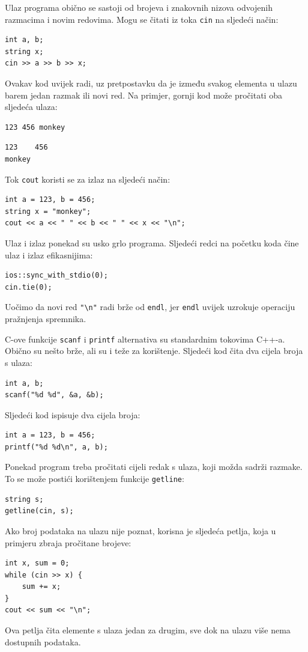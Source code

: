 Ulaz programa obično se sastoji od
brojeva i znakovnih nizova odvojenih
razmacima i novim redovima.
Mogu se čitati iz toka \texttt{cin}
na sljedeći način:

\begin{lstlisting}
int a, b;
string x;
cin >> a >> b >> x;
\end{lstlisting}

Ovakav kod uvijek radi,
uz pretpostavku da je između svakog elementa u ulazu
barem jedan razmak ili novi red.
Na primjer, gornji kod može pročitati
oba sljedeća ulaza:
\begin{lstlisting}
123 456 monkey
\end{lstlisting}
\begin{lstlisting}
123    456
monkey
\end{lstlisting}
Tok \texttt{cout} koristi se za izlaz
na sljedeći način:
\begin{lstlisting}
int a = 123, b = 456;
string x = "monkey";
cout << a << " " << b << " " << x << "\n";
\end{lstlisting}

Ulaz i izlaz ponekad su
usko grlo programa.
Sljedeći redci na početku koda
čine ulaz i izlaz efikasnijima:

\begin{lstlisting}
ios::sync_with_stdio(0);
cin.tie(0);
\end{lstlisting}

Uočimo da novi red \texttt{"\textbackslash n"}
radi brže od \texttt{endl},
jer \texttt{endl} uvijek uzrokuje
operaciju pražnjenja spremnika.

C-ove funkcije \texttt{scanf}
i \texttt{printf} alternativa su
standardnim tokovima C++-a.
Obično su nešto brže,
ali su i teže za korištenje.
Sljedeći kod čita dva cijela broja s ulaza:
\begin{lstlisting}
int a, b;
scanf("%d %d", &a, &b);
\end{lstlisting}
Sljedeći kod ispisuje dva cijela broja:
\begin{lstlisting}
int a = 123, b = 456;
printf("%d %d\n", a, b);
\end{lstlisting}

Ponekad program treba pročitati cijeli redak
s ulaza, koji možda sadrži razmake.
To se može postići korištenjem
funkcije \texttt{getline}:

\begin{lstlisting}
string s;
getline(cin, s);
\end{lstlisting}

Ako broj podataka na ulazu nije poznat, korisna je
sljedeća petlja, koja u primjeru zbraja
pročitane brojeve:
\begin{lstlisting}
int x, sum = 0;
while (cin >> x) {
    sum += x;
}
cout << sum << "\n";
\end{lstlisting}
Ova petlja čita elemente s ulaza
jedan za drugim, sve dok na ulazu
više nema dostupnih podataka.

